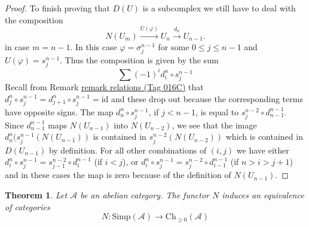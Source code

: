 \documentclass{amsart}
\theoremstyle{plain}
\newtheorem{theorem}[subsection]{Theorem}
\theoremstyle{definition}
\theoremstyle{remark}
\numberwithin{equation}{subsection}
\begin{document}
\begin{proof}
\medskip\noindent
To finish proving that $D(U)$ is a subcomplex
we still have to deal with the composition
$$
N(U_m) \xrightarrow{U(\varphi)} U_n \xrightarrow{d_n} U_{n - 1}.
$$
in case $m =  n - 1$. In this case $\varphi = \sigma^{n - 1}_j$
for some $0 \leq j \leq n - 1$ and $U(\varphi) = s^{n - 1}_j$.
Thus the composition is given by the sum
$$
\sum (-1)^i d^n_i \circ s^{n - 1}_j
$$
Recall from Remark \href{https://stacks.math.columbia.edu/tag/016C}{remark relations (Tag 016C)} that
$d^n_j \circ s^{n - 1}_j = d^n_{j + 1} \circ s^{n - 1}_j = \text{id}$
and these drop out because the corresponding terms have opposite signs.
The map $d^n_n \circ s^{n - 1}_j$, if $j < n - 1$, is equal to
$s^{n - 2}_j \circ d^{n - 1}_{n - 1}$. Since
$d^{n - 1}_{n - 1}$ maps $N(U_{n - 1})$ into $N(U_{n - 2})$,
we see that the image $d^n_n ( s^{n - 1}_j (N(U_{n - 1}))$
is contained in $s^{n - 2}_j(N(U_{n - 2}))$ which
is contained in $D(U_{n - 1})$ by definition. For all
other combinations of $(i, j)$ we have
either $d^n_i \circ s^{n - 1}_j = s^{n - 2}_{j - 1} \circ d^{n - 1}_i$
(if $i < j$), or
$d^n_i \circ s^{n - 1}_j = s^{n - 2}_j \circ d^{n - 1}_{i - 1}$
(if $n > i > j + 1$) and in these cases the map is zero because
of the definition of $N(U_{n - 1})$.
\end{proof}


\begin{theorem}
\label{theorem-dold-kan}
Let $\mathcal{A}$ be an abelian category.
The functor $N$ induces an equivalence of
categories
$$
N :
\text{Simp}(\mathcal{A})
\longrightarrow
\text{Ch}_{\geq 0}(\mathcal{A})
$$
\end{theorem}
\end{document}
